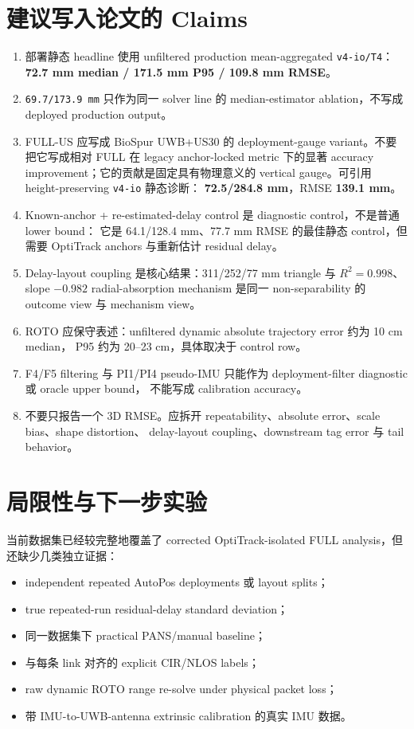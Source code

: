 \documentclass[UTF8,11pt,a4paper]{ctexart}
\newcommand{\case}[1]{\texttt{#1}}
\begin{document}
\section{建议写入论文的 Claims}

\begin{enumerate}
    \item 部署静态 headline 使用 unfiltered production mean-aggregated \case{v4-io/T4}：
    \textbf{72.7 mm median / 171.5 mm P95 / 109.8 mm RMSE}。
    \item \case{69.7/173.9 mm} 只作为同一 solver line 的 median-estimator ablation，不写成 deployed production output。
    \item FULL-US 应写成 BioSpur UWB+US30 的 deployment-gauge variant。不要把它写成相对 FULL
    在 legacy anchor-locked metric 下的显著 accuracy improvement；它的贡献是固定具有物理意义的
    vertical gauge。可引用 height-preserving \case{v4-io} 静态诊断：
    \textbf{72.5/284.8 mm}，RMSE \textbf{139.1 mm}。
    \item Known-anchor + re-estimated-delay control 是 diagnostic control，不是普通 lower bound：
    它是 64.1/128.4 mm、77.7 mm RMSE 的最佳静态 control，但需要 OptiTrack anchors 与重新估计 residual delay。
    \item Delay-layout coupling 是核心结果：311/252/77 mm triangle 与 \(R^2=0.998\)、slope \(-0.982\)
    radial-absorption mechanism 是同一 non-separability 的 outcome view 与 mechanism view。
    \item ROTO 应保守表述：unfiltered dynamic absolute trajectory error 约为 10 cm median，
    P95 约为 20--23 cm，具体取决于 control row。
    \item F4/F5 filtering 与 PI1/PI4 pseudo-IMU 只能作为 deployment-filter diagnostic 或 oracle upper bound，
    不能写成 calibration accuracy。
    \item 不要只报告一个 3D RMSE。应拆开 repeatability、absolute error、scale bias、shape distortion、
    delay-layout coupling、downstream tag error 与 tail behavior。
\end{enumerate}

\section{局限性与下一步实验}

当前数据集已经较完整地覆盖了 corrected OptiTrack-isolated FULL analysis，但还缺少几类独立证据：
\begin{itemize}
    \item independent repeated AutoPos deployments 或 layout splits；
    \item true repeated-run residual-delay standard deviation；
    \item 同一数据集下 practical PANS/manual baseline；
    \item 与每条 link 对齐的 explicit CIR/NLOS labels；
    \item raw dynamic ROTO range re-solve under physical packet loss；
    \item 带 IMU-to-UWB-antenna extrinsic calibration 的真实 IMU 数据。
\end{itemize}
\end{document}
